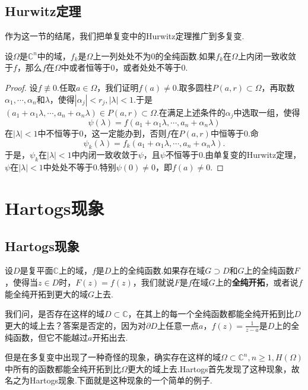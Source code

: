 \subsection{Hurwitz定理}
作为这一节的结尾，我们把单复变中的Hurwitz定理推广到多复变.
\begin{theorem}\label{thm1.2.10}
设$\Omega$是$\mathbb{C}^n$中的域，$f_k$是$\Omega$上一列处处不为$0$的全纯函数.如果$f_k$在$\Omega$上内闭一致收敛于$f$，那么$f$在$\Omega$中或者恒等于$0$，或者处处不等于$0$.
\end{theorem}
\begin{proof}
	设$f\not\equiv0$.任取$a\in\Omega$，我们证明$f(a)\neq0$.取多圆柱$P(a,r)\subset\Omega$，再取数$\alpha_1,\cdots,\alpha_n$和$\lambda$，使得$|\alpha_j|<r_j,|\lambda|<1$.于是$(a_1+\alpha_1\lambda,\cdots,a_n+\alpha_n\lambda)\in P(a,r)\subset\Omega$.在满足上述条件的$\alpha_j$中选取一组，使得
	\[\psi(\lambda)=f(a_1+\alpha_1\lambda,\cdots,a_n+\alpha_n\lambda)\]
	在$|\lambda|<1$中不恒等于$0$，这一定能办到，否则$f$在$P(a,r)$中恒等于$0$.命
	\[\psi_k(\lambda)=f_k(a_1+\alpha_1\lambda,\cdots,a_n+\alpha_n\lambda).\]
	于是，$\psi_k$在$|\lambda|<1$中内闭一致收敛于$\psi$，且$\psi$不恒等于$0$.由单复变的Hurwitz定理，$\psi$在$|\lambda|<1$中处处不等于$0$.特别$\psi(0)\neq0$，即$f(a)\neq0$.
\end{proof}

\section{Hartogs现象\label{sec1.3}}
\subsection{Hartogs现象}
设$D$是复平面$\mathbb{C}$上的域，$f$是$D$上的全纯函数.如果存在域$G\supset D$和$G$上的全纯函数$F$，使得当$z\in D$时，$F(z)=f(z)$，我们就说$F$是$f$在域$G$上的\textbf{全纯开拓}，或者说$f$能全纯开拓到更大的域$G$上去.

我们问，是否存在这样的域$D\subset\mathbb{C}$，在其上的每一个全纯函数都能全纯开拓到比$D$更大的域上去？答案是否定的，因为对$\partial D$上任意一点$a$，$f(z)=\frac1{z-a}$是$D$上的全纯函数，但它不能越过$a$开拓出去.

但是在多复变中出现了一种奇怪的现象，确实存在这样的域$\Omega\subset\mathbb{C}^n,n\ge1,H(\Omega)$中所有的函数都能全纯开拓到比$\Omega$更大的域上去.Hartogs首先发现了这种现象，故名之为Hartogs现象.下面就是这种现象的一个简单的例子.

